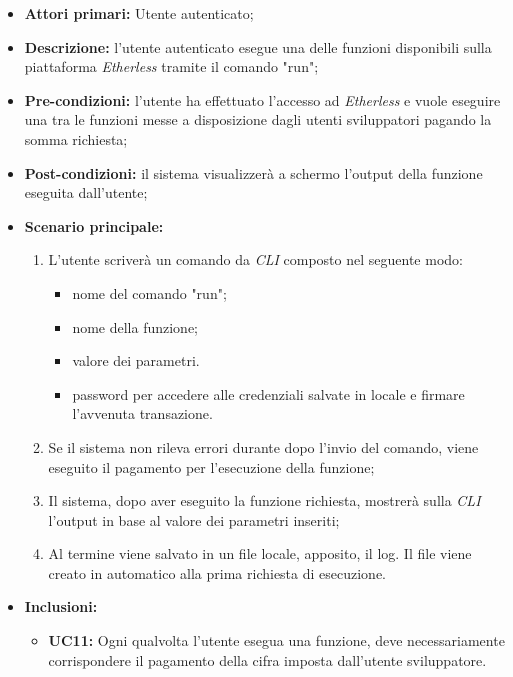 \begin{itemize}
	\item \textbf{Attori primari:} Utente autenticato;
	\item \textbf{Descrizione:} l'utente autenticato esegue una delle funzioni disponibili sulla piattaforma \textit{Etherless} tramite il comando "run";
	\item \textbf{Pre-condizioni:} l'utente ha effettuato l'accesso ad \textit{Etherless} e vuole eseguire una tra le funzioni messe a disposizione dagli utenti sviluppatori pagando la somma richiesta;
	\item \textbf{Post-condizioni:} il sistema visualizzerà a schermo l'output della funzione eseguita dall'utente;
	\item \textbf{Scenario principale:}
	\begin{enumerate}
		\item L'utente scriverà un comando da \textit{CLI\glo} composto nel seguente modo:
		\begin{itemize}
			\item nome del comando "run";
			\item nome della funzione;
			\item valore dei parametri.
			\item password per accedere alle credenziali salvate in locale e firmare l'avvenuta transazione.
		\end{itemize}
		\item Se il sistema non rileva errori durante dopo l'invio del comando, viene eseguito il pagamento per l'esecuzione della funzione;
		\item Il sistema, dopo aver eseguito la funzione richiesta, mostrerà sulla \textit{CLI\glo} l'output in base al valore dei parametri inseriti;
		\item Al termine viene salvato in un file locale, apposito, il log. Il file viene creato in automatico alla prima richiesta di esecuzione.
	\end{enumerate}
	\item \textbf{Inclusioni:}
	\begin{itemize}
		\item \textbf{UC11:} Ogni qualvolta l'utente esegua una funzione, deve necessariamente corrispondere il pagamento della cifra imposta dall'utente sviluppatore.
	\end{itemize}
\end{itemize}

